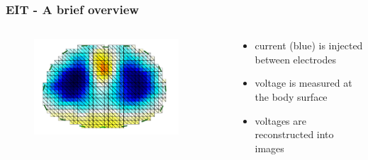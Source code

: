 \documentclass[10pt,    %
    english,            %
    xcolor=table,       %
    envcountsect,        %
    aspectratio=1610
]{beamer}
\begin{document}
\begin{frame}
\frametitle{EIT - A brief overview}    
\begin{columns}[c]
	\begin{column}{0.5\textwidth}
		\begin{figure}[H]
			\centering
			\includegraphics[width=0.9\textwidth]{current_density_image.pdf}
		\end{figure}
	\end{column}
	\begin{column}{0.5\textwidth}
		\begin{itemize}
			\item current (blue) is injected between electrodes
			\item voltage is measured at the body surface
			\item \alert{voltages are reconstructed into images}
		\end{itemize}
	\end{column}
\end{columns}
\end{frame}
\end{document}
